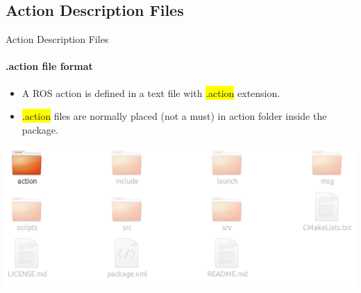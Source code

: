 \documentclass{beamer}
\begin{document}
\subsection{Action Description Files}

\begin{frame}{Action Description Files}
    \framesubtitle{.action file format}
    \begin{itemize}
        \item A ROS action is defined in a text file with  {\ttfamily \colorbox{yellow}{.action}} extension.
        \item {\ttfamily \colorbox{yellow}{.action}} files are normally placed (not a must) in {\ttfamily \colorbox{gray!30!white}{action}} folder inside the package.
    \end{itemize}
    \vspace{2mm}
    \includegraphics[width=1\linewidth]{figures/package.png}
\end{frame}
\end{document}
